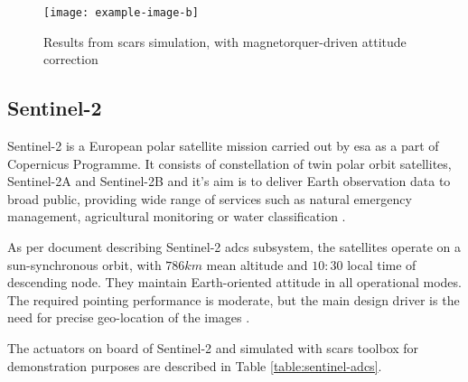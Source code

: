             \begin{figure}[H]
                \centering
                \texttt{[image: example-image-b]}
                \caption{Results from \ac{scars} simulation, with magnetorquer-driven attitude correction}
                \label{fig:scars-deorbit3}
            \end{figure}




    \subsection{Sentinel-2} 
    
    Sentinel-2 is a European polar satellite mission carried out by \ac{esa} as a part of Copernicus Programme. It consists of constellation of twin polar orbit satellites, Sentinel-2A and Sentinel-2B and it's aim is to deliver Earth observation data to broad public, providing wide range of services such as natural emergency management, agricultural monitoring or water classification  \cite{sentinelreference_description}.

    As per document describing Sentinel-2 \ac{adcs} subsystem, the satellites operate on a sun-synchronous orbit, with $786km$ mean altitude and $10:30$ local time of descending node. They maintain Earth-oriented attitude in all operational modes. The required pointing performance is moderate, but the main design driver is the need for precise geo-location of the images \cite{sentinelreference_adcs}.

    The actuators on board of Sentinel-2 and simulated with \ac{scars} toolbox for demonstration purposes are described in Table \ref{table:sentinel-adcs}.

        
